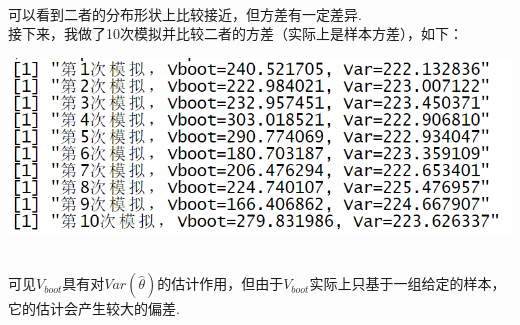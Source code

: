\documentclass{article}
\begin{document}
\begin{CJK}{UTF8}{gbsn}
\begin{minipage}{0.5\textwidth}
\end{minipage}
\\可以看到二者的分布形状上比较接近，但方差有一定差异.
\\接下来，我做了10次模拟并比较二者的方差（实际上是样本方差），如下：\\
\begin{minipage}{0.5\textwidth}
    \includegraphics[scale=0.6]{bootstrap_data.png}
\end{minipage}
\\
可见$V_{boot}$具有对$Var(\hat{\theta})$的估计作用，但由于$V_{boot}$实际上只基于一组给定的样本，它的估计会产生较大的偏差.
\end{CJK}
\end{document}
